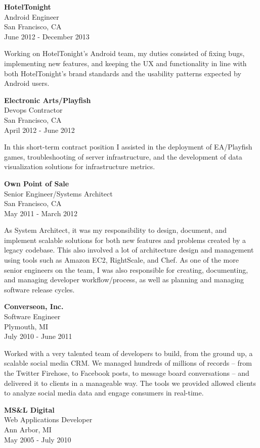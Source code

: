 \documentclass[]{article}
\begin{document}
\textbf{HotelTonight}\\
Android Engineer\\
San Francisco, CA\\
June 2012 - December 2013

Working on HotelTonight's Android team, my duties consisted of fixing
bugs, implementing new features, and keeping the UX and functionality in
line with both HotelTonight's brand standards and the usability patterns
expected by Android users.

\textbf{Electronic Arts/Playfish}\\
Devops Contractor\\
San Francisco, CA\\
April 2012 - June 2012

In this short-term contract position I assisted in the deployment of
EA/Playfish games, troubleshooting of server infrastructure, and the
development of data visualization solutions for infrastructure metrics.

\textbf{Own Point of Sale}\\
Senior Engineer/Systems Architect\\
San Francisco, CA\\
May 2011 - March 2012

As System Architect, it was my responsibility to design, document, and
implement scalable solutions for both new features and problems created
by a legacy codebase. This also involved a lot of architecture design
and management using tools such as Amazon EC2, RightScale, and Chef. As
one of the more senior engineers on the team, I was also responsible for
creating, documenting, and managing developer workflow/process, as well
as planning and managing software release cycles.

\textbf{Converseon, Inc.}\\
Software Engineer\\
Plymouth, MI\\
July 2010 - June 2011

Worked with a very talented team of developers to build, from the ground
up, a scalable social media CRM. We managed hundreds of millions of
records -- from the Twitter Firehose, to Facebook posts, to message
board conversations -- and delivered it to clients in a manageable way.
The tools we provided allowed clients to analyze social media data and
engage consumers in real-time.

\textbf{MS\&L Digital}\\
Web Applications Developer\\
Ann Arbor, MI\\
May 2005 - July 2010
\end{document}
